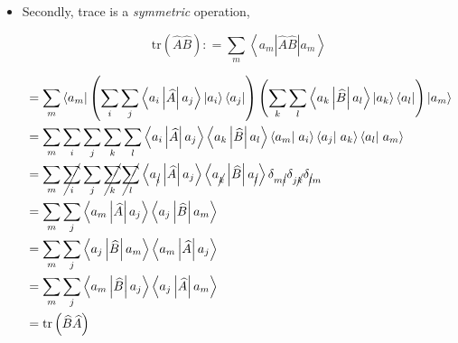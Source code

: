 \documentclass[9pt,handout]{beamer}
\newcommand{\tr}[0]{\text{tr}}
\begin{document}
\begin{frame}{}
\begin{itemize}
\item Secondly, trace is a \emph{symmetric} operation,

$$\tr \left( \widehat{A} \widehat{B} \right) : = \sum_m \left\langle a_m \left\lvert \widehat{A} \widehat{B} \right\rvert a_m \right\rangle$$

\begin{align*}
& = \sum_m \left\langle a_m \right\rvert \left( \sum_i \sum_j \left\langle a_i \left\lvert \widehat{A} \right\vert a_j \right\rangle \left\lvert a_i \right\rangle \left\langle a_j \right\rvert \right) \left( \sum_k \sum_l \left\langle a_k \left\lvert \widehat{B} \right\vert a_l \right\rangle \left\lvert a_k \right\rangle \left\langle a_l \right\rvert \right) \left\lvert a_m \right\rangle \\
& = \sum_m \sum_i \sum_j \sum_k \sum_l \left\langle a_i \left\lvert \widehat{A} \right\vert a_j \right\rangle \left\langle a_k \left\lvert \widehat{B} \right\vert a_l \right\rangle \left\langle a_m \right\rvert \left. a_i \right\rangle \left\langle a_j \right\rvert \left. a_k \right\rangle \left\langle a_l \right\rvert \left. a_m \right\rangle \\
& = \sum_m \cancel{\sum_i} \sum_j \cancel{\sum_k} \cancel{\sum_l} \left\langle a_{\cancel{i}} \left\lvert \widehat{A} \right\vert a_j \right\rangle \left\langle a_{\cancel{k}} \left\lvert \widehat{B} \right\vert a_{\cancel{l}} \right\rangle \delta_{m \cancel{i}} \delta_{j \cancel{k}} \delta_{\cancel{l} m} \\
& = \sum_m \sum_j \left\langle a_{m} \left\lvert \widehat{A} \right\vert a_j \right\rangle \left\langle a_{j} \left\lvert \widehat{B} \right\vert a_{m} \right\rangle \\
& = \sum_m \sum_j \left\langle a_{j} \left\lvert \widehat{B} \right\vert a_{m} \right\rangle \left\langle a_{m} \left\lvert \widehat{A} \right\vert a_j \right\rangle \\
& = \sum_m \sum_j \left\langle a_{m} \left\lvert \widehat{B} \right\vert a_{j} \right\rangle \left\langle a_{j} \left\lvert \widehat{A} \right\vert a_{m} \right\rangle \\
& = \tr \left( \widehat{B} \widehat{A} \right)
\end{align*}
\end{itemize}
\end{frame}
\end{document}

